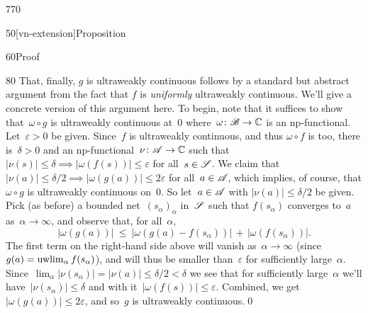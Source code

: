 \begin{parsec}{770}
\begin{point}{50}[vn-extension]{Proposition}
\begin{point}{60}{Proof}
\begin{point}{80}
That, finally, $g$ is ultraweakly continuous
follows by a standard but abstract argument from the fact
that $f$ is \emph{uniformly} ultraweakly continuous.
We'll give a concrete version of this argument here.
To begin, note that it suffices to show that~$\omega\circ g$
is ultraweakly continuous
at~$0$
where~$\omega\colon \mathscr{B}\to\mathbb{C}$
is an np-functional.
Let~$\varepsilon>0$ be given.
Since~$f$ 
is ultraweakly continuous,
and 
thus $\omega\circ f$ is too,
there is~$\delta>0$ and an np-functional~$\nu\colon \mathscr{A}\to\mathbb{C}$
such that $\left|\nu(s)\right|\leq \delta \implies 
\left|\omega(f(s))\right|\leq \varepsilon$
for all~$s\in\mathscr{S}$.
We claim that $\left|\nu(a)\right|\leq \delta/2 \implies
\left|\omega(g(a))\right|\leq 2\varepsilon$
for all~$a\in\mathscr{A}$,
which implies, of course,
that $\omega\circ g$ is ultraweakly continuous on~$0$.
So let~$a\in\mathscr{A}$ with $\left|\nu(a)\right|\leq \delta/2$
be given.
Pick (as before) a bounded net~$(s_\alpha)_\alpha$
in~$\mathscr{S}$
such that $f(s_\alpha)$
converges to~$a$ as~$\alpha\to\infty$, and observe that,
for all~$\alpha$,
\begin{equation*}
\left|\omega(g (a))\right|
\ \leq\ 
\left|\omega(g(a)-f(s_\alpha))\right|
\,+\,\left|\omega(f(s_\alpha))\right|.
\end{equation*}
The first term on the right-hand side above will 
vanish as~$\alpha\to\infty$ (since 
$g (a)=\uwlim_\alpha f (s_\alpha)$),
and will thus be smaller than~$\varepsilon$ 
for sufficiently large~$\alpha$.
Since~$\lim_\alpha \left|\nu(s_\alpha)\right|=\left|\nu(a)\right|
\leq \delta/2<\delta$
we see 
that for sufficiently large~$\alpha$
we'll have~$\left|\nu(s_\alpha)\right|\leq \delta$ 
and with it~$\left|\omega(f (s))\right|\leq \varepsilon$.
Combined,
we get $\left|\omega(g (a))\right|\leq 2\varepsilon$,
and so~$g$ is ultraweakly continuous.\qed
\end{point}
\end{point}
\end{point}
\end{parsec}
